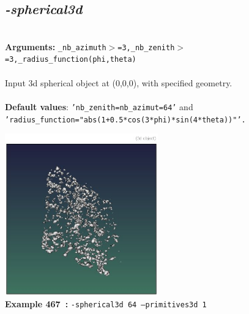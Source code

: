 \documentclass[a4paper,11pt,twoside]{book}
\begin{document}
\subsection{\emph{-spherical3d} }\vspace*{-0.5em}
~\\\textbf{Arguments: } 
{\small \texttt{\_nb\_azimuth$>$=3,\_nb\_zenith$>$=3,\_radius\_function(phi,theta)}}\\~\\
Input 3d spherical object at (0,0,0), with specified geometry.
~\\~\\\textbf{Default values}: {\small \texttt{'nb\_zenith=nb\_azimut=64'} and \texttt{'radius\_function="abs(1+0.5*cos(3*phi)*sin(4*theta))"'.}}
\begin{center}\includegraphics[keepaspectratio=true,height=7cm,width=\textwidth]{img/gmic_def467.jpg}\\
{\footnotesize \textbf{Example 467~:} \texttt{-spherical3d 64 --primitives3d 1}}
\end{center}
\end{document}
